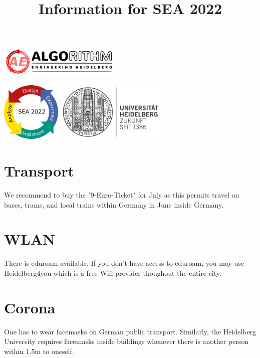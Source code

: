 \documentclass{article}
\title{Information for SEA 2022}
\date{}
\begin{document}
\begin{center}
\begin{minipage}{5cm}
\vspace*{-2.4cm}
        \includegraphics[width=6cm]{logo3}
        \end{minipage}
        \hspace*{1.5cm}
        \includegraphics[width=2.85cm]{tasseentwurf_vec_sea}
        \hspace*{.5cm}
        \includegraphics[width=5.3cm]{heidelberg-university.png}
\end{center}
\section{Transport}
We recommend to buy the "9-Euro-Ticket" for July as this permits travel on buses, trams, and local trains within Germany in June inside Germany. 
\section{WLAN}
There is eduroam available. If you don't have access to eduroam, you may use Heidelberg4you which is a free Wifi provider thoughout the entire city.
\section{Corona}
One has to wear facemasks on German public transport. Similarly, the Heidelberg University requires facemasks inside buildings whenever there is another person within 1.5m to oneself. 
\end{document}
